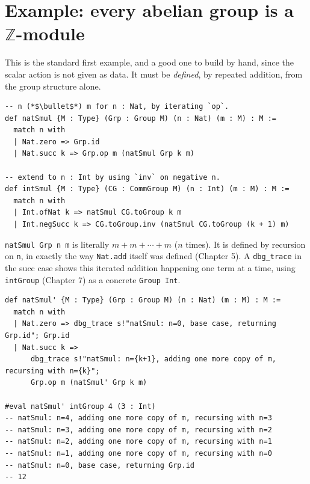 \section{\texorpdfstring{Example: every abelian group is a \(\mathbb{Z}\)-module}{Example: every abelian group is a \textbackslash mathbb\{Z\}-module}}\label{sec:11-modules:03-z-module-example:1}

This is the standard first example, and a good one to build by hand, since the scalar action is not given as data. It must be \emph{defined}, by repeated addition, from the group structure alone.

\begin{lstlisting}
-- n (*$\bullet$*) m for n : Nat, by iterating `op`.
def natSmul {M : Type} (Grp : Group M) (n : Nat) (m : M) : M :=
  match n with
  | Nat.zero => Grp.id
  | Nat.succ k => Grp.op m (natSmul Grp k m)

-- extend to n : Int by using `inv` on negative n.
def intSmul {M : Type} (CG : CommGroup M) (n : Int) (m : M) : M :=
  match n with
  | Int.ofNat k => natSmul CG.toGroup k m
  | Int.negSucc k => CG.toGroup.inv (natSmul CG.toGroup (k + 1) m)
\end{lstlisting}

\texttt{natSmul Grp n m} is literally \(m + m + \cdots + m\) (\(n\) times). It is defined by recursion on \texttt{n}, in exactly the way \texttt{Nat.add} itself was defined (Chapter 5). A \texttt{dbg\_\allowbreak{}trace} in the succ case shows this iterated addition happening one term at a time, using \texttt{intGroup} (Chapter 7) as a concrete \texttt{Group Int}.

\begin{lstlisting}
def natSmul' {M : Type} (Grp : Group M) (n : Nat) (m : M) : M :=
  match n with
  | Nat.zero => dbg_trace s!"natSmul: n=0, base case, returning Grp.id"; Grp.id
  | Nat.succ k =>
      dbg_trace s!"natSmul: n={k+1}, adding one more copy of m, recursing with n={k}";
      Grp.op m (natSmul' Grp k m)

#eval natSmul' intGroup 4 (3 : Int)
-- natSmul: n=4, adding one more copy of m, recursing with n=3
-- natSmul: n=3, adding one more copy of m, recursing with n=2
-- natSmul: n=2, adding one more copy of m, recursing with n=1
-- natSmul: n=1, adding one more copy of m, recursing with n=0
-- natSmul: n=0, base case, returning Grp.id
-- 12
\end{lstlisting}

